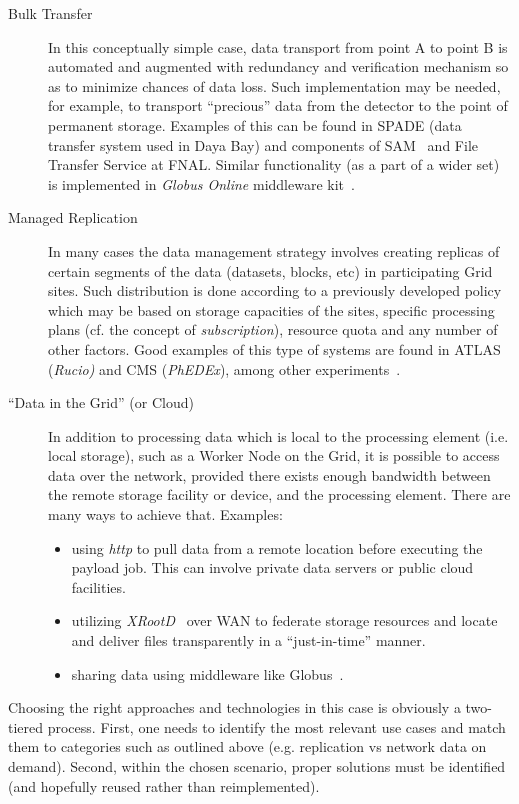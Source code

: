 \begin{description}
\item[Bulk Transfer] In this conceptually simple case, data transport from point A to point B is automated and augmented
with redundancy and verification mechanism so as to minimize chances of data loss. Such implementation may be needed,
for example, to transport ``precious'' data from the detector to the point of permanent storage.
Examples of this can be found in SPADE (data transfer system used in Daya Bay) and components of SAM~\cite{SAM} and File Transfer Service at FNAL.
Similar functionality (as a part of a wider set) is implemented in \textit{Globus Online} middleware kit~\cite{globus}.

\item[Managed Replication] In many cases the data management strategy involves creating replicas of certain segments of the data (datasets, blocks, etc)
in participating Grid sites. Such distribution is done according to a previously developed policy which may be based on storage capacities of 
the sites, specific processing plans (cf. the concept of \textit{subscription}), resource quota and any number of other factors. Good examples of this type of systems are found in
ATLAS (\textit{Rucio)} and CMS (\textit{PhEDEx}), among other experiments~\cite{rucio_chep13,phedex_chep09}.

\item[``Data in the Grid'' (or Cloud)] In addition to processing data which is local to the processing element (i.e. local storage), such as a Worker Node
on the Grid, it is possible to access data over the network, provided there exists enough bandwidth between the remote storage
facility or device, and the processing element. There are many ways to achieve that. Examples:
\begin{itemize}
\item using \textit{http} to pull data from a remote location before executing the payload job. This can involve private data servers or public cloud facilities.
\item utilizing \textit{XRootD}~\cite{xrootd,xrootd_web} over WAN to federate storage resources and locate and deliver files transparently in a ``just-in-time'' manner.
\item sharing data using middleware like Globus~\cite{globus}.
\end{itemize}

\end{description}


Choosing the right approaches and technologies in this case is obviously a two-tiered process. First, one needs to identify the most
 relevant use cases and match them to categories such as outlined above (e.g. replication vs network data on demand). Second, within
 the chosen scenario, proper solutions must be identified (and hopefully reused rather than reimplemented).
   

